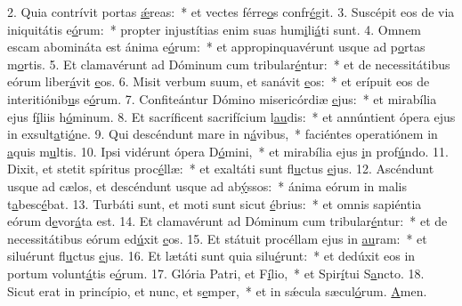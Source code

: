 2. Quia contrívit portas \uline{ǽ}reas:~* et vectes férre\uline{o}s confr\uline{é}git.
3. Suscépit eos de via iniquitátis e\uline{ó}rum:~* propter injustítias enim suas hum\uline{i}li\uline{á}ti sunt.
4. Omnem escam abomináta est ánima e\uline{ó}rum:~* et appropinquavérunt usque ad p\uline{o}rtas m\uline{o}rtis.
5. Et clamavérunt ad Dóminum cum tribular\uline{é}ntur:~* et de necessitátibus eórum liber\uline{á}vit \uline{e}os.
6. Misit verbum suum, et sanávit \uline{e}os:~* et erípuit eos de interitiónib\uline{u}s e\uline{ó}rum.
7. Confiteántur Dómino misericórdiæ \uline{e}jus:~* et mirabília ejus f\uline{í}liis h\uline{ó}minum.
8. Et sacríficent sacrifícium l\uline{au}dis:~* et annúntient ópera ejus in exsult\uline{a}ti\uline{ó}ne.
9. Qui descéndunt mare in n\uline{á}vibus,~* faciéntes operatiónem in \uline{a}quis m\uline{u}ltis.
10. Ipsi vidérunt ópera D\uline{ó}mini,~* et mirabília ejus \uline{i}n prof\uline{ú}ndo.
11. Dixit, et stetit spíritus proc\uline{é}llæ:~* et exaltáti sunt fl\uline{u}ctus \uline{e}jus.
12. Ascéndunt usque ad cælos, et descéndunt usque ad ab\uline{ý}ssos:~* ánima eórum in malis t\uline{a}besc\uline{é}bat.
13. Turbáti sunt, et moti sunt sicut \uline{é}brius:~* et omnis sapiéntia eórum d\uline{e}vor\uline{á}ta est.
14. Et clamavérunt ad Dóminum cum tribular\uline{é}ntur:~* et de necessitátibus eórum ed\uline{ú}xit \uline{e}os.
15. Et státuit procéllam ejus in \uline{au}ram:~* et siluérunt fl\uline{u}ctus \uline{e}jus.
16. Et lætáti sunt quia silu\uline{é}runt:~* et dedúxit eos in portum volunt\uline{á}tis e\uline{ó}rum.
17. Glória Patri, et F\uline{í}lio,~* et Spir\uline{í}tui S\uline{a}ncto.
18. Sicut erat in princípio, et nunc, et s\uline{e}mper,~* et in sǽcula sæcul\uline{ó}rum. \uline{A}men.

